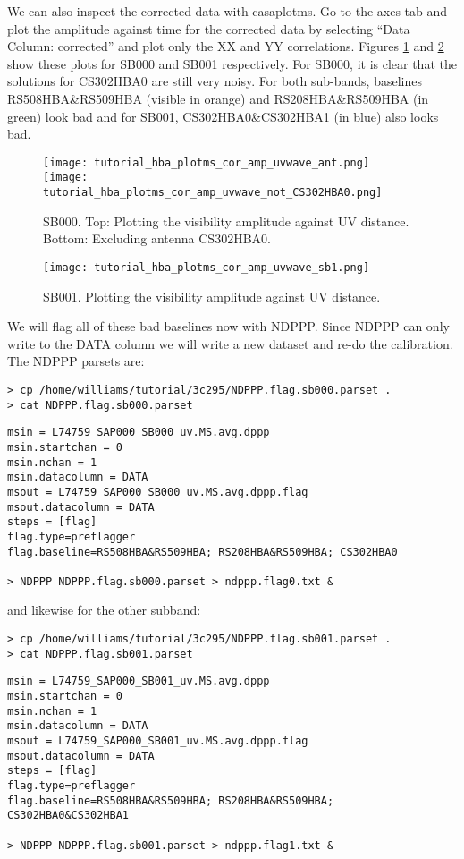 We can also inspect the corrected data with casaplotms. Go to the axes tab and plot the amplitude against time for the corrected data by selecting ``Data Column: corrected'' and plot only the XX and YY correlations. Figures \ref{fig:corrected_plotms0} and \ref{fig:corrected_plotms1} show these plots for SB000 and SB001 respectively. For SB000, it is clear that the solutions for CS302HBA0 are still very noisy. For both sub-bands, baselines RS508HBA\&RS509HBA (visible in orange) and RS208HBA\&RS509HBA (in green) look bad and for SB001, CS302HBA0\&CS302HBA1 (in blue) also looks bad.


\begin{figure}[htp]
 \centering
\texttt{[image: tutorial\_hba\_plotms\_cor\_amp\_uvwave\_ant.png]}\\
\texttt{[image: tutorial\_hba\_plotms\_cor\_amp\_uvwave\_not\_CS302HBA0.png]}
\caption{SB000. Top: Plotting the visibility amplitude against UV distance.
Bottom: Excluding antenna CS302HBA0.}
\label{fig:corrected_plotms0}
\end{figure}
\begin{figure}[htp]
 \centering
\texttt{[image: tutorial\_hba\_plotms\_cor\_amp\_uvwave\_sb1.png]}
\caption{SB001. Plotting the visibility amplitude against UV distance.}
\label{fig:corrected_plotms1}
\end{figure}

We will flag all of these bad baselines now with NDPPP. Since NDPPP can only write to the DATA column we will write a new dataset and re-do the calibration. The NDPPP parsets are:
\begin{verbatim}
> cp /home/williams/tutorial/3c295/NDPPP.flag.sb000.parset .
> cat NDPPP.flag.sb000.parset
\end{verbatim}
\begin{lstlisting}
msin = L74759_SAP000_SB000_uv.MS.avg.dppp
msin.startchan = 0
msin.nchan = 1
msin.datacolumn = DATA
msout = L74759_SAP000_SB000_uv.MS.avg.dppp.flag
msout.datacolumn = DATA
steps = [flag]
flag.type=preflagger
flag.baseline=RS508HBA&RS509HBA; RS208HBA&RS509HBA; CS302HBA0

> NDPPP NDPPP.flag.sb000.parset > ndppp.flag0.txt &
\end{lstlisting}
and likewise for the other subband:
\begin{verbatim}
> cp /home/williams/tutorial/3c295/NDPPP.flag.sb001.parset .
> cat NDPPP.flag.sb001.parset
\end{verbatim}
\begin{lstlisting}
msin = L74759_SAP000_SB001_uv.MS.avg.dppp
msin.startchan = 0
msin.nchan = 1
msin.datacolumn = DATA
msout = L74759_SAP000_SB001_uv.MS.avg.dppp.flag
msout.datacolumn = DATA
steps = [flag]
flag.type=preflagger
flag.baseline=RS508HBA&RS509HBA; RS208HBA&RS509HBA; CS302HBA0&CS302HBA1

> NDPPP NDPPP.flag.sb001.parset > ndppp.flag1.txt &
\end{lstlisting}

